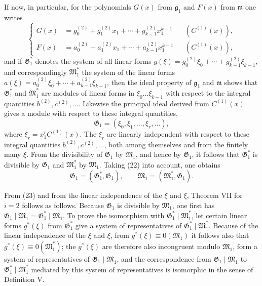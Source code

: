 \documentclass[11pt]{article}
\providecommand{\Gmod}{\mathfrak G}
\providecommand{\mideal}{\mathfrak m}
\providecommand{\gideal}{\mathfrak g}
\providecommand{\Gmod}{\mathfrak G}
\providecommand{\Mmod}{\mathfrak M}
\providecommand{\mideal}{\mathfrak m}
\providecommand{\gideal}{\mathfrak g}
\begin{document}
If now, in particular, for the polynomials $G(x)$ from $\gideal_1$ and $F(x)$ from $\mideal$ one writes
\begin{equation}
 \left\{\begin{aligned}
 G(x)&=g^{(2)}_0+g^{(2)}_1x_1+\cdots+g^{(2)}_{k-1}x_1^{k-1} &&(C^{(1)}(x)),\\
 F(x)&=a^{(2)}_0+a^{(2)}_1x_1+\cdots+a^{(2)}_{k-1}x_1^{k-1} &&(C^{(1)}(x)),
 \end{aligned}\right.
\tag{22}
\end{equation}
and if $\Gmod^*_1$ denotes the system of all linear forms $g(\xi)=g^{(2)}_0\xi_0+\cdots+g^{(2)}_{k-1}\xi_{k-1}$, and correspondingly $\Mmod^*_1$ the system of the linear forms $a(\xi)=a^{(2)}_0\xi_0+\cdots+a^{(2)}_{k-1}\xi_{k-1}$, then the ideal property of $\gideal_1$ and $\mideal$ shows that $\Gmod^*_1$ and $\Mmod^*_1$ are modules of linear forms in $\xi_0\ldots\xi_{k-1}$ with respect to the integral quantities $b^{(2)},c^{(2)},\ldots$. Likewise the principal ideal derived from $C^{(1)}(x)$ gives a module with respect to these integral quantities,
\[
 \Gmod_1=(\xi_0,\xi_1,\ldots,\xi_r,\ldots),
\]
where $\xi_r=x_1^rC^{(1)}(x)$. The $\xi_r$ are linearly independent with respect to these integral quantities $b^{(2)},c^{(2)},\ldots$, both among themselves and from the finitely many $\xi$. From the divisibility of $\Gmod_1$ by $\Mmod_1$, and hence by $\Gmod_1$, it follows that $\Gmod^*_1$ is divisible by $\Gmod_1$ and $\Mmod^*_1$ by $\Mmod_1$. Taking (22) into account, one obtains
\begin{equation}
 \Gmod_1=(\Gmod^*_1,\Gmod_1),\qquad
 \Mmod_1=(\Mmod^*_1,\Gmod_1).
\tag{23}
\end{equation}

From (23) and from the linear independence of the $\xi$ and $\xi$, Theorem VII for $i=2$ follows as follows. Because $\Gmod_1$ is divisible by $\Mmod_1$, one first has $\Gmod_1\mid\Mmod_1=\Gmod^*_1\mid\Mmod_1$. To prove the isomorphism with $\Gmod^*_1\mid\Mmod^*_1$, let certain linear forms $g^*(\xi)$ from $\Gmod^*_1$ give a system of representatives of $\Gmod^*_1\mid\Mmod^*_1$. Because of the linear independence of the $\xi$ and $\xi$, from $g^*(\xi)\equiv0(\Mmod_1)$ it follows also that $g^*(\xi)\equiv0(\Mmod^*_1)$; the $g^*(\xi)$ are therefore also incongruent modulo $\Mmod_1$, form a system of representatives of $\Gmod_1\mid\Mmod_1$, and the correspondence from $\Gmod_1\mid\Mmod_1$ to $\Gmod^*_1\mid\Mmod^*_1$ mediated by this system of representatives is isomorphic in the sense of Definition V.
\end{document}
